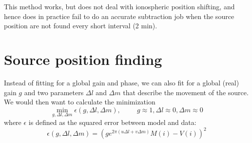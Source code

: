 \documentclass[a4paper,11pt]{article}
\begin{document}
This method works, but does not deal with ionospheric position shifting, and hence does in practice fail to do an accurate subtraction job when the source position are not found every short interval (2 min).

\section{Source position finding}
Instead of fitting for a global gain and phase, we can also fit for a global (real) gain $g$ and two parameters $\Delta l$ and $\Delta m$ that describe the movement of the source. We would then want to calculate the minimization
\begin{equation}
 \min_{g,\Delta l,\Delta m} \epsilon(g,\Delta l,\Delta m),\hspace{1cm} g\approx 1, \Delta l\approx 0, \Delta m\approx 0
\end{equation}
where $\epsilon$ is defined as the squared error between model and data:
\begin{equation}
 \epsilon(g,\Delta l,\Delta m) = \left( g e^{2\pi \left( u\Delta l + v\Delta m\right)} M(i) - V(i) \right)^2
\end{equation}


\label{lastpage}
\end{document}
